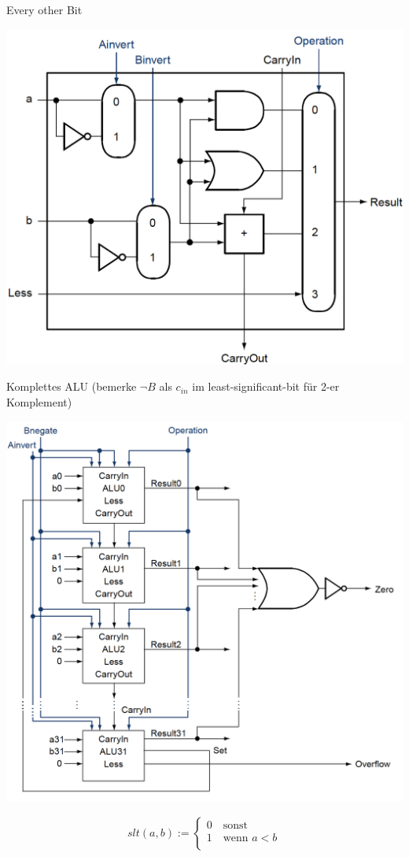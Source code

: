 \documentclass[a4paper,6pt]{article}
\begin{document}
\begin{multicols*}{3}
Every other Bit
\begin{center}
    \includegraphics[width=1\linewidth]{resources/ALU_EveryOtherBit.png}
\end{center}

Komplettes ALU (bemerke $\neg B$ als $c_{in}$ im least-significant-bit für 2-er Komplement)
\begin{center}    
    \includegraphics[width=1\linewidth]{resources/ALU_Complete.png}
\end{center}

$$
slt(a,b) :=
\begin{cases}
    0 \quad \text{sonst} \\
    1 \quad \text{wenn } a < b \\
\end{cases}
$$


\end{multicols*}
\end{document}
